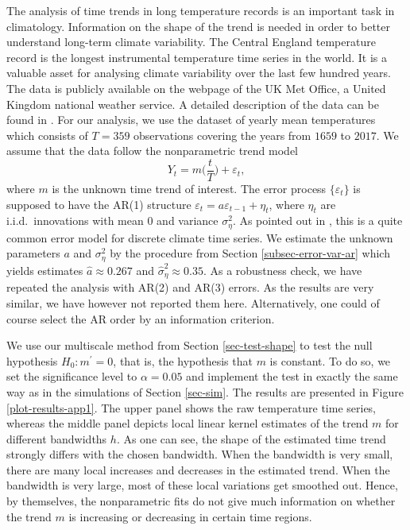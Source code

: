 The analysis of time trends in long temperature records is an important task in climatology. Information on the shape of the trend is needed in order to better understand long-term climate variability. The Central England temperature record is the longest instrumental temperature time series in the world. It is a valuable asset for analysing climate variability over the last few hundred years. The data is publicly available on the webpage of the UK Met Office, a United Kingdom national weather service. A detailed description of the data can be found in \cite{Parker1992}. For our analysis, we use the dataset of yearly mean temperatures which consists of $T=359$ observations covering the years from $1659$ to $2017$. We assume that the data follow the nonparametric trend model 
\[ Y_t = m\Big(\frac{t}{T}\Big) + \varepsilon_t, \]
where $m$ is the unknown time trend of interest. The error process $\{ \varepsilon_t \}$ is supposed to have the AR(1) structure $\varepsilon_t = a \varepsilon_{t-1} + \eta_t$, where $\eta_t$ are i.i.d.\ innovations with mean $0$ and variance $\sigma_\eta^2$. As pointed out in \cite{Mudelsee2010}, this is a quite common error model for discrete climate time series. We estimate the unknown parameters $a$ and $\sigma_\eta^2$ by the procedure from Section \ref{subsec-error-var-ar} which yields estimates $\widehat{a} \approx 0.267$ and $\widehat{\sigma}_\eta^2 \approx 0.35$. As a robustness check, we have repeated the analysis with AR(2) and AR(3) errors. As the results are very similar, we have however not reported them here. Alternatively, one could of course select the AR order by an information criterion.   


We use our multiscale method from Section \ref{sec-test-shape} to test the null hypothesis $H_0: m^\prime = 0$, that is, the hypothesis that $m$ is constant. To do so, we set the significance level to $\alpha = 0.05$ and implement the test in exactly the same way as in the simulations of Section \ref{sec-sim}. The results are presented in Figure \ref{plot-results-app1}. The upper panel shows the raw temperature time series, whereas the middle panel depicts local linear kernel estimates of the trend $m$ for different bandwidths $h$. As one can see, the shape of the estimated time trend strongly differs with the chosen bandwidth. When the bandwidth is very small, there are many local increases and decreases in the estimated trend. When the bandwidth is very large, most of these local variations get smoothed out. Hence, by themselves, the nonparametric fits do not give much information on whether the trend $m$ is increasing or decreasing in certain time regions. 


